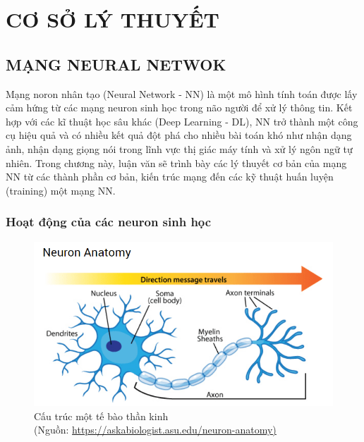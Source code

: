 \chapter{CƠ SỞ LÝ THUYẾT}
\label{c:co_so_ly_thuyet}

\section{MẠNG NEURAL NETWOK}

				
				

Mạng noron nhân tạo (Neural Network - NN) là một mô hình tính toán được lấy cảm hứng từ các mạng neuron sinh học trong não người để xử lý thông tin. Kết hợp với các kĩ thuật học sâu khác (Deep Learning - DL), NN  trở thành một công cụ hiệu quả và có nhiều kết quả đột phá cho nhiều bài toán khó như nhận dạng ảnh, nhận dạng giọng nói trong lĩnh vực thị giác máy tính và xử lý ngôn ngữ tự nhiên. Trong chương này, luận văn sẽ trình bày các lý thuyết cơ bản của mạng NN từ các thành phần cơ bản, kiến trúc mạng đến các kỹ thuật huấn luyện (training) một mạng NN.

\subsection{Hoạt động của các neuron sinh học}

\FloatBarrier
\begin{figure}[htp]
\begin{center}
\includegraphics[scale=0.8]{chap2/c2_figs/neuron.png}
\end{center}
\caption{Cấu trúc một tế bào thần kinh \\ (Nguồn: \url{https://askabiologist.asu.edu/neuron-anatomy)}}
\label{fig:neuronsinhhoc}
\end{figure}
\FloatBarrier

